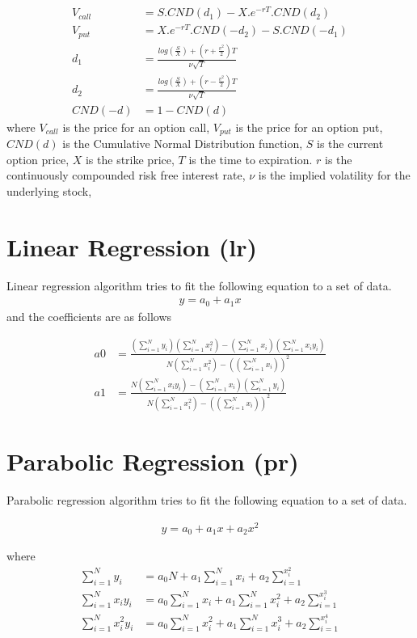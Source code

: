 \documentclass[]{report}
\begin{document}
\begin{align}
V_{call} &= S.CND(d_1) - X.e^{-rT}.CND(d_2)  \\
V_{put}  &= X.e^{-rT}.CND(-d_2)-S.CND(-d_1) \\
d_1      &= \frac{log(\frac{S}{X})+(r+\frac{v^2}{2})T}{\nu \sqrt{T}} \\
d_2      &= \frac{log(\frac{S}{X})+(r-\frac{v^2}{2})T}{\nu \sqrt{T}} \\
CND(-d) &= 1- CND(d)
\end{align}
where
$V_{call}$ is the price for an option call,
$V_{put}$ is the price for an option put,
$CND(d)$ is the Cumulative Normal Distribution function,
$S$ is the current option price,
$X$ is the strike price,
$T$ is the time to expiration.
$r$ is the continuously compounded risk free interest rate,
$\nu$ is the implied volatility for the underlying stock,




\section{Linear Regression (lr)}
Linear regression algorithm tries to fit the following equation to a set of data.
\begin{align}
y=a_0+a_1x
\end{align}
and the coefficients are as follows

\begin{align}
a0&=\frac{(\sum_{i=1}^{N}y_i)(\sum_{i=1}^{N}x_i^2)-(\sum_{i=1}^{N}x_i)(\sum_{i=1}^{N}x_iy_i)}{N(\sum_{i=1}^{N}x_i^2)-((\sum_{i=1}^{N}x_i))^2} \\
a1&=\frac{N(\sum_{i=1}^{N}x_iy_i)-(\sum_{i=1}^{N}x_i)(\sum_{i=1}^{N}y_i)}{N(\sum_{i=1}^{N}x_i^2)-((\sum_{i=1}^{N}x_i))^2}
\end{align}


\section{Parabolic Regression (pr)}
Parabolic regression algorithm tries to fit the following equation to a set of data.

\begin{align}
y=a_0+a_1x+a_2x^2
\end{align}

where
\begin{align}
\sum_{i=1}^{N}y_i &= a_0N+a_1\sum_{i=1}^{N}x_i+a_2\sum_{i=1}^{x_i^2} \\
\sum_{i=1}^{N}x_iy_i &= a_0\sum_{i=1}^{N}x_i+a_1\sum_{i=1}^{N}x_i^2+a_2\sum_{i=1}^{x_i^3} \\
\sum_{i=1}^{N}x_i^2y_i &= a_0\sum_{i=1}^{N}x_i^2+a_1\sum_{i=1}^{N}x_i^3+a_2\sum_{i=1}^{x_i^4} 
\end{align}
\end{document}
